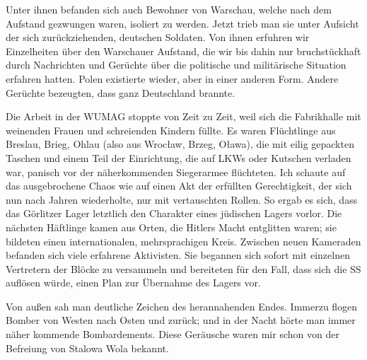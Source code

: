 Unter ihnen befanden sich auch Bewohner von Warschau, welche nach dem Aufstand gezwungen waren, isoliert zu werden. Jetzt trieb man sie unter Aufsicht der sich zurückziehenden, deutschen Soldaten. Von ihnen erfuhren wir Einzelheiten über den Warschauer Aufstand, die wir bis dahin nur bruchstückhaft durch Nachrichten und Gerüchte über die politische und militärische Situation erfahren hatten. Polen existierte wieder, aber in einer anderen Form. Andere Gerüchte bezeugten, dass ganz Deutschland brannte. 

Die Arbeit in der WUMAG stoppte von Zeit zu Zeit, weil sich die Fabrikhalle mit weinenden Frauen und schreienden Kindern füllte. Es waren Flüchtlinge aus Breslau, Brieg, Ohlau (also aus Wroc\l aw, Brzeg, O\l awa), die mit eilig gepackten Taschen und einem Teil der Einrichtung, die auf LKWs oder Kutschen verladen war, panisch vor der näherkommenden Siegerarmee flüchteten. Ich schaute auf das ausgebrochene Chaos wie auf einen Akt der erfüllten Gerechtigkeit, der sich nun nach Jahren wiederholte, nur mit vertauschten Rollen. So ergab es sich, dass das Görlitzer Lager letztlich den Charakter eines jüdischen Lagers vorlor. Die nächsten Häftlinge kamen aus Orten, die Hitlers Macht entglitten waren; sie bildeten einen internationalen, mehrsprachigen Kreis. Zwischen neuen Kameraden befanden sich viele erfahrene Aktivisten. Sie begannen sich sofort mit einzelnen Vertretern der Blöcke zu versammeln und bereiteten für den Fall, dass sich die SS auflösen würde, einen Plan zur Übernahme des Lagers vor.

Von außen sah man deutliche Zeichen des herannahenden Endes. Immerzu flogen Bomber von Westen nach Osten und zurück; und in der Nacht hörte man immer näher kommende Bombardements. Diese Geräusche waren mir schon von der Befreiung von Stalowa Wola bekannt.

